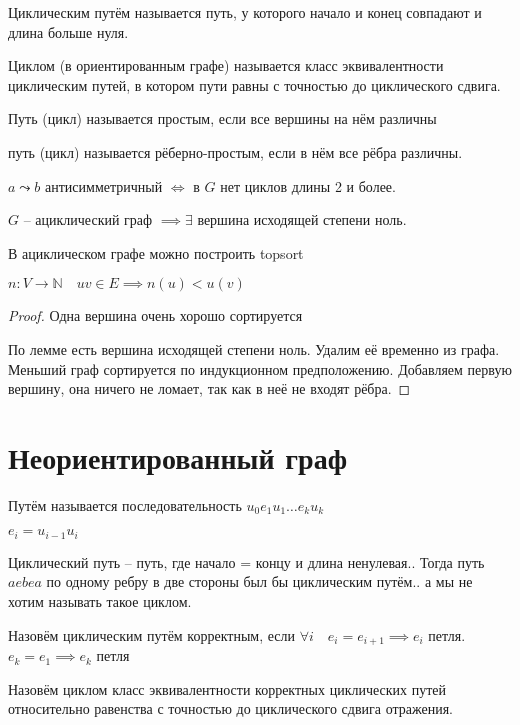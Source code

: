 \documentclass{book}
\newcommand\N{\ensuremath{\mathbb{N}}}
\theoremstyle{definition}
\begin{document}
    \begin{definition}
        Циклическим путём называется путь, у которого начало и конец совпадают и длина больше нуля.

        Циклом (в ориентированным графе) называется класс эквивалентности циклическим путей, в котором пути равны с точностью до циклического сдвига.

        Путь (цикл) называется простым, если все вершины на нём различны

        путь (цикл) называется рёберно-простым, если в нём все рёбра различны.
    \end{definition}

    \begin{statement}
        $a\leadsto b$ антисимметричный  $\iff $ в $G$ нет циклов длины 2 и более.
    \end{statement}

    \begin{lemma}
        $G$ -- ациклический граф  $\implies \exists $ вершина исходящей степени ноль.
    \end{lemma}
    \begin{corollary}
        В ациклическом графе можно построить topsort

        $n:V\to \N \quad uv\in E \implies  n(u) < u(v)$
    \end{corollary}
    \begin{proof}
        Одна вершина очень хорошо сортируется

        По лемме есть вершина исходящей степени ноль. Удалим её временно из графа. Меньший граф сортируется по индукционном предположению. Добавляем первую вершину, она ничего не ломает, так как в неё не входят рёбра.
    \end{proof}

    \section{Неориентированный граф}
    \begin{definition}
        Путём называется последовательность $u_0e_1u_1\ldots e_ku_k$

        $e_i = u_{i-1}u_i$
    \end{definition}

    \begin{definition}
        Циклический путь -- путь, где начало = концу и длина ненулевая.. Тогда путь $aebea$ по одному ребру в две стороны был бы циклическим путём.. а мы не хотим называть такое циклом.

        Назовём циклическим путём корректным, если  $\forall i\quad e_i = e_{i+1} \implies  e_i$ петля. $e_k = e_1 \implies  e_k$ петля

        Назовём циклом класс эквивалентности корректных циклических путей относительно равенства с точностью до циклического сдвига отражения.
    \end{definition}
\end{document}
